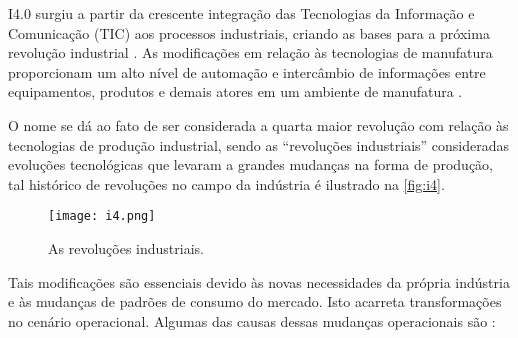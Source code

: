 I4.0 surgiu a partir da crescente integração das Tecnologias da Informação e Comunicação (TIC) aos processos industriais, criando as bases para a próxima revolução industrial \cite{hermann2016design}. As modificações em relação às tecnologias de manufatura proporcionam um alto nível de automação e intercâmbio de informações entre equipamentos, produtos e demais atores em um ambiente de manufatura \cite{lasi2014industryfour}.

O nome se dá ao fato de ser considerada a quarta maior revolução com relação às tecnologias de produção industrial, sendo as ``revoluções industriais'' consideradas evoluções tecnológicas que levaram a grandes mudanças na forma de produção, tal histórico de revoluções no campo da indústria é ilustrado na \autoref{fig:i4}.

\begin{figure}[t]
	\centering
	\texttt{[image: i4.png]}
	\caption{As revoluções industriais.}
	\label{fig:i4}
\end{figure}

Tais modificações são essenciais devido às novas necessidades da própria indústria e às mudanças de padrões de consumo do mercado. Isto acarreta transformações no cenário operacional. Algumas das causas dessas mudanças operacionais são \cite{lasi2014industryfour}:

